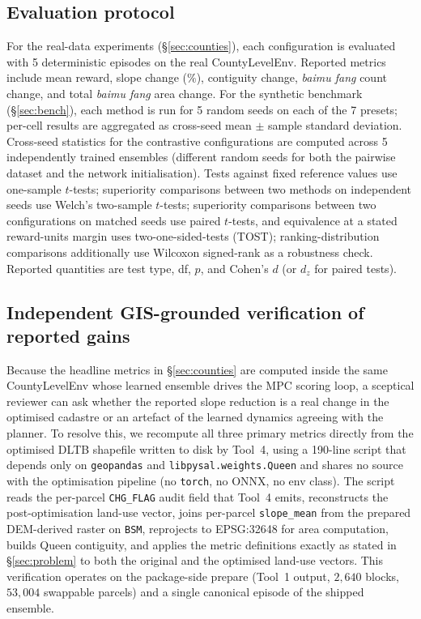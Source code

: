 \documentclass[11pt]{article}
\begin{document}
\subsection*{Evaluation protocol}

For the real-data experiments (\S\ref{sec:counties}), each configuration is evaluated with 5 deterministic episodes on the real CountyLevelEnv. Reported metrics include mean reward, slope change ($\%$), contiguity change, \textit{baimu fang} count change, and total \textit{baimu fang} area change. For the synthetic benchmark (\S\ref{sec:bench}), each method is run for 5 random seeds on each of the 7 presets; per-cell results are aggregated as cross-seed mean $\pm$ sample standard deviation. Cross-seed statistics for the contrastive configurations are computed across 5 independently trained ensembles (different random seeds for both the pairwise dataset and the network initialisation). Tests against fixed reference values use one-sample $t$-tests; superiority comparisons between two methods on independent seeds use Welch's two-sample $t$-tests; superiority comparisons between two configurations on matched seeds use paired $t$-tests, and equivalence at a stated reward-units margin uses two-one-sided-tests (TOST); ranking-distribution comparisons additionally use Wilcoxon signed-rank as a robustness check. Reported quantities are test type, df, $p$, and Cohen's $d$ (or $d_z$ for paired tests).

\subsection*{Independent GIS-grounded verification of reported gains}\label{sec:methods-validate}

Because the headline metrics in \S\ref{sec:counties} are computed inside the same CountyLevelEnv whose learned ensemble drives the MPC scoring loop, a sceptical reviewer can ask whether the reported slope reduction is a real change in the optimised cadastre or an artefact of the learned dynamics agreeing with the planner. To resolve this, we recompute all three primary metrics directly from the optimised DLTB shapefile written to disk by Tool~4, using a 190-line script that depends only on \texttt{geopandas} and \texttt{libpysal.weights.Queen} and shares no source with the optimisation pipeline (no \texttt{torch}, no ONNX, no env class). The script reads the per-parcel \texttt{CHG\_FLAG} audit field that Tool~4 emits, reconstructs the post-optimisation land-use vector, joins per-parcel \texttt{slope\_mean} from the prepared DEM-derived raster on \texttt{BSM}, reprojects to EPSG:32648 for area computation, builds Queen contiguity, and applies the metric definitions exactly as stated in \S\ref{sec:problem} to both the original and the optimised land-use vectors. This verification operates on the package-side prepare (Tool~1 output, $2{,}640$ blocks, $53{,}004$ swappable parcels) and a single canonical episode of the shipped ensemble.
\end{document}
